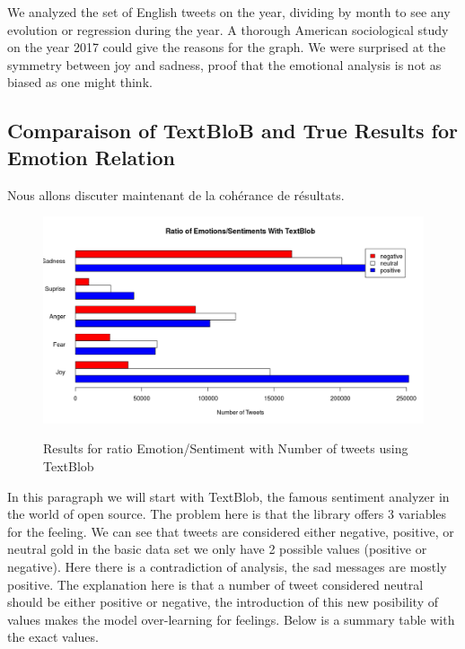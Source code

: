 \documentclass{acmtog} %
\begin{document}
We analyzed the set of English tweets on the year, dividing by month to see any evolution or regression during the year. A thorough American sociological study on the year 2017 could give the reasons for the graph. We were surprised at the symmetry between joy and sadness, proof that the emotional analysis is not as biased as one might think. 

\subsection{Comparaison of TextBloB and True Results for Emotion Relation}
\label{subsub:comparaisonEmotionRelation}

Nous allons discuter maintenant de la cohérance de résultats.

\begin{figure}[h!]
{\includegraphics[width=\linewidth]{ratio-textblob.png}}
\caption{Results for ratio Emotion/Sentiment with Number of tweets using TextBlob}
  \label{fig:contradiction_barplot}
\end{figure}


In this paragraph we will start with TextBlob, the famous sentiment analyzer in the world of open source. The problem here is that the library offers 3 variables for the feeling. We can see that tweets are considered either negative, positive, or neutral gold in the basic data set we only have 2 possible values ​​(positive or negative). Here there is a contradiction of analysis, the sad messages are mostly positive. The explanation here is that a number of tweet considered neutral should be either positive or negative, the introduction of this new posibility of values ​​makes the model over-learning for feelings. Below is a summary table with the exact values.

\begin{table}[H]
\label{tab:cross_tab_TextBLOB}
\end{table}
\end{document}
